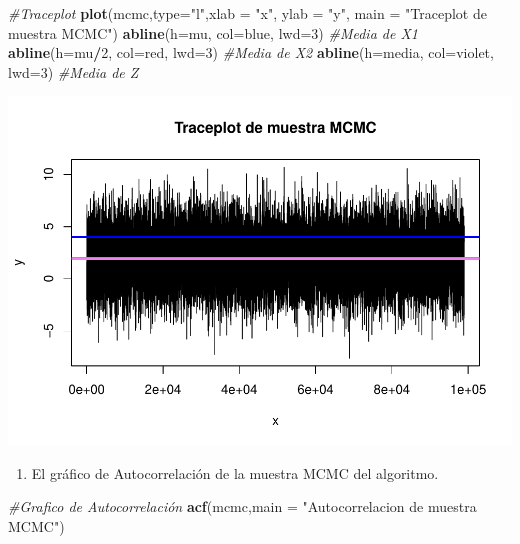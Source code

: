 \documentclass[
]{article}
\newenvironment{Shaded}{\begin{snugshade}}{\end{snugshade}}
\newcommand{\AttributeTok}[1]{\textcolor[rgb]{0.13,0.29,0.53}{#1}}
\newcommand{\CommentTok}[1]{\textcolor[rgb]{0.56,0.35,0.01}{\textit{#1}}}
\newcommand{\DecValTok}[1]{\textcolor[rgb]{0.00,0.00,0.81}{#1}}
\newcommand{\FunctionTok}[1]{\textcolor[rgb]{0.13,0.29,0.53}{\textbf{#1}}}
\newcommand{\NormalTok}[1]{#1}
\newcommand{\SpecialCharTok}[1]{\textcolor[rgb]{0.81,0.36,0.00}{\textbf{#1}}}
\newcommand{\StringTok}[1]{\textcolor[rgb]{0.31,0.60,0.02}{#1}}
\providecommand{\tightlist}{%
  \setlength{\itemsep}{0pt}\setlength{\parskip}{0pt}}
\begin{document}
\begin{Shaded}
\begin{Highlighting}[]
\CommentTok{\#Traceplot}
\FunctionTok{plot}\NormalTok{(mcmc,}\AttributeTok{type=}\StringTok{"l"}\NormalTok{,}\AttributeTok{xlab =} \StringTok{"x"}\NormalTok{, }\AttributeTok{ylab =} \StringTok{"y"}\NormalTok{, }\AttributeTok{main =} \StringTok{"Traceplot de muestra MCMC"}\NormalTok{)}
\FunctionTok{abline}\NormalTok{(}\AttributeTok{h=}\NormalTok{mu, }\AttributeTok{col=}\StringTok{\textquotesingle{}blue\textquotesingle{}}\NormalTok{, }\AttributeTok{lwd=}\DecValTok{3}\NormalTok{)      }\CommentTok{\#Media de X1}
\FunctionTok{abline}\NormalTok{(}\AttributeTok{h=}\NormalTok{mu}\SpecialCharTok{/}\DecValTok{2}\NormalTok{, }\AttributeTok{col=}\StringTok{\textquotesingle{}red\textquotesingle{}}\NormalTok{, }\AttributeTok{lwd=}\DecValTok{3}\NormalTok{)     }\CommentTok{\#Media de X2}
\FunctionTok{abline}\NormalTok{(}\AttributeTok{h=}\NormalTok{media, }\AttributeTok{col=}\StringTok{\textquotesingle{}violet\textquotesingle{}}\NormalTok{, }\AttributeTok{lwd=}\DecValTok{3}\NormalTok{) }\CommentTok{\#Media de Z}
\end{Highlighting}
\end{Shaded}

\includegraphics{tarea2_files/figure-latex/unnamed-chunk-25-1.pdf}

\begin{enumerate}
\def\labelenumi{\alph{enumi}.}
\setcounter{enumi}{4}
\tightlist
\item
  El gráfico de Autocorrelación de la muestra MCMC del algoritmo.
\end{enumerate}

\begin{Shaded}
\begin{Highlighting}[]
\CommentTok{\#Grafico de Autocorrelación}
\FunctionTok{acf}\NormalTok{(mcmc,}\AttributeTok{main =} \StringTok{"Autocorrelacion de muestra MCMC"}\NormalTok{)}
\end{Highlighting}
\end{Shaded}
\end{document}
